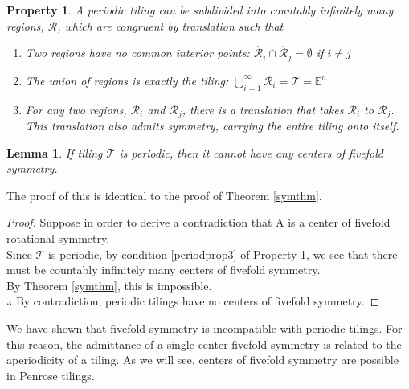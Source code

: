 \documentclass[]{article}
\newtheorem{myprop}{Property}
\newtheorem{mylem}{Lemma}
\begin{document}
\begin{myprop}
A periodic tiling can be subdivided into countably infinitely many regions, $\mathcal{R}$, which are congruent by translation such that
\begin{enumerate}
\item Two regions have no common interior points: $\mathring{\mathcal{R}_i} \cap  \mathring{\mathcal{R}_j}=\emptyset$ if $i\neq j$
\item The union of regions is exactly the tiling: $\bigcup_{i=1}^\infty \mathcal{R}_i = \mathcal{T}=\mathbb{E}^n$
\item For any two regions, $\mathcal{R}_i$ and $\mathcal{R}_j$, there is a translation that takes  $\mathcal{R}_i$ to $\mathcal{R}_j$. This translation also admits symmetry, carrying the entire tiling onto itself. \label{periodprop3}
\end{enumerate}
\label{periodprop}
\end{myprop}

\begin{mylem}
If tiling $\mathcal{T}$ is periodic, then it cannot have any centers of fivefold symmetry.
\end{mylem}
The proof of this is identical to the proof of Theorem \ref{symthm}.
\begin{proof}
Suppose in order to derive a contradiction that A is a center of fivefold rotational symmetry.\\
Since $\mathcal{T}$ is periodic, by condition \ref{periodprop3} of Property \ref{periodprop}, we see that there must be countably infinitely many centers of fivefold symmetry.\\
By Theorem \ref{symthm}, this is impossible.\\
$\therefore$ By contradiction, periodic tilings have no centers of fivefold symmetry.
\end{proof}

We have shown that fivefold symmetry is incompatible with periodic tilings. For this reason, the admittance of a single center fivefold symmetry is related to the aperiodicity of a tiling. As we will see, centers of fivefold symmetry are possible in Penrose tilings. 

\nocite{Penrose1979,Ogawa1999,Kepler1997,DeBruijn1990,DeBruijn1989,DeBruijn1981,Conway1986}


\end{document}
